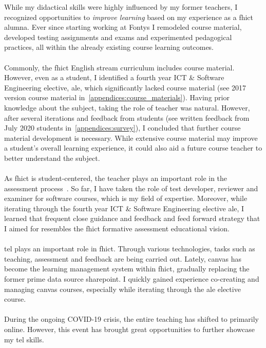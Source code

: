 While my didactical skills were highly influenced by my former teachers, I recognized opportunities to \textit{improve learning} based on my experience as a \acrshort{fhict} alumna. 
Ever since starting working at Fontys I remodeled course material, developed testing assignments and exams and experimented pedagogical practices, all within the already existing course learning outcomes.\\\\
Commonly, the \acrshort{fhict} English stream curriculum includes course material. 
However, even as a student, I identified a fourth year ICT \& Software Engineering elective, \acrfull{ale}, which significantly lacked course material (see 2017 version course material in~\cref{appendices:course_materials}). 
Having prior knowledge about the subject, taking the role of teacher was natural. 
However, after several iterations and feedback from students (see written feedback from July 2020 students in~\cref{appendices:survey}), I concluded that further course material development is necessary. 
While extensive course material may improve a student's overall learning experience, it could also aid a future course teacher to better understand the subject.\\\\
As \acrshort{fhict} is student-centered, the teacher plays an important role in the assessment process~\cite{FHICTAssesmentPolicy}.
So far, I have taken the role of test developer, reviewer and examiner for software courses, which is my field of expertise. Moreover, while iterating through the fourth year ICT \& Software Engineering elective \acrshort{ale}, I learned that frequent close guidance and feedback and feed forward strategy that I aimed for resembles the \acrshort{fhict} formative assessment educational vision.\\\\
\Acrfull{tel} plays an important role in \acrshort{fhict}. Through various technologies, tasks such as teaching, assessment and feedback are being carried out. 
Lately, \Gls{canvas} has become the learning management system within \acrshort{fhict}, gradually replacing the former prime data source \Gls{sharepoint}. 
I quickly gained experience co-creating and managing \Gls{canvas} courses, especially while iterating through the \acrshort{ale} elective course.\\\\
During the ongoing COVID-19 crisis, the entire teaching has shifted to primarily online. 
However, this event has brought great opportunities to further showcase my \acrshort{tel} skills. 







